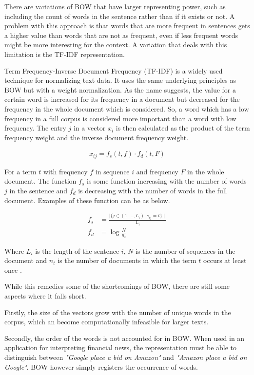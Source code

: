 There are variations of BOW that have larger representing power, such as including the count of words in the sentence rather than if it exists or not. A problem with this approach is that words that are more frequent in sentences gets a higher value than words that are not as frequent, even if less frequent words might be more interesting for the context. A variation that deals with this limitation is the TF-IDF representation. 

Term Frequency-Inverse Document Frequency (TF-IDF) is a widely used technique for normalizing text data. It uses the same underlying principles as BOW but with a weight normalization. As the name suggests, the value for a certain word is increased for its frequency in a document but decreased for the frequency in the whole document which is considered. So, a word which has a low frequency in a full corpus is considered more important than a word with low frequency. The entry $j$ in a vector $x_i$ is then calculated as the product of the term frequency weight and the inverse document frequency weight. 

\begin{align*}
    x_{ij} = f_s(t,f) \cdot f_d(t,F)
\end{align*}

For a term $t$ with frequency $f$ in sequence $i$ and frequency $F$ in the whole document. The function $f_s$ is some function increasing with the number of words $j$ in the sentence and $f_d$ is decreasing with the number of words in the full document. Examples of these function can be as below. 

\begin{align*}
    f_s &= \frac{\mid \{ j \in (1, \hdots , L_i) : s_{ij} = t  \} \mid}{L_i} \\
    f_d &= \log{\frac{N}{n_t}}
\end{align*}

Where $L_i$ is the length of the sentence $i$, $N$ is the number of sequences in the document and $n_t$ is the number of documents in which the term $t$ occurs at least once \citep{manning2008introduction}. 

While this remedies some of the shortcomings of BOW, there are still some aspects where it falls short. 

Firstly, the size of the vectors grow with the number of unique words in the corpus, which an become computationally infeasible for larger texts. 

Secondly, the order of the words is not accounted for in BOW. When used in an application for interpreting financial news, the representation must be able to distinguish between \textit{"Google place a bid on Amazon"} and \textit{"Amazon place a bid on Google"}. BOW however simply registers the occurrence of words. 

